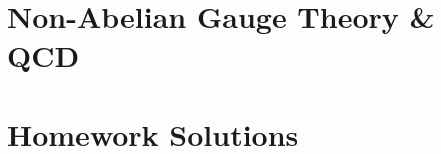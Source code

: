 \documentclass[12pt, a4paper]{article}
\begin{document}
\part{Non-Abelian Gauge Theory \& QCD}
\newpage
\newpage
\newpage
\newpage
\newpage
\newpage
\newpage
\newpage
\newpage
\newpage
% 

\part{Homework Solutions}










\end{document}
